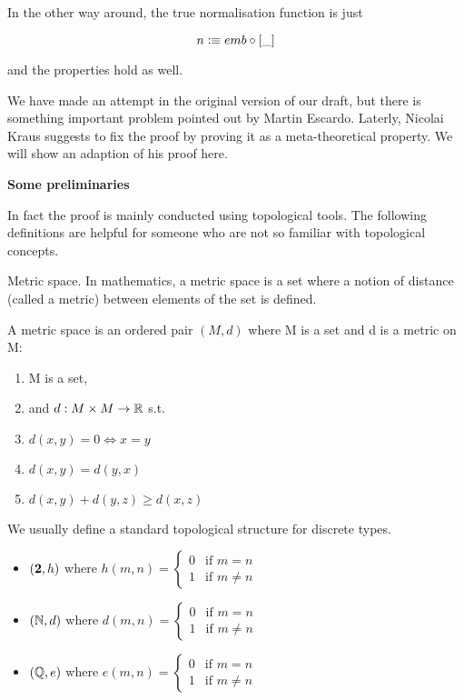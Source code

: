 In the other way around, the true normalisation function is just

\begin{equation*}
n \vcentcolon\equiv emb \circ [\_]
\end{equation*}

and the properties hold as well.


We have made an attempt in the original version of our \cite{aan}
draft, but there is something important problem pointed out by Martin Escardo. Laterly, Nicolai
Kraus suggests to fix the proof by proving it as a meta-theoretical
property. We will show an adaption of his proof here.

\textbf{Some preliminaries}

In fact the proof is mainly conducted using topological tools. The
following definitions are helpful for someone who are not so familiar
with topological concepts.


\begin{definition}
Metric space. In mathematics, a metric space is a set where a notion
of distance (called a metric) between elements of the set is defined.

A metric space is an ordered pair $(M , d)$ where M is a set and d is a metric on M:
\begin{enumerate}
\item M is a set,
\item and $d : M \times M \rightarrow \mathbb{R}$ s.t.
\item $d (x , y) = 0 \iff x = y$
\item $d(x,y)=d(y,x)$
\item $d(x,y)+d(y,z) \ge d(x,z)$ 
\end{enumerate}
\end{definition}

We usually define a standard topological structure for discrete types.

\begin{itemize}

\item $(\mathbf{2} , h)$ where 
$h(m,n) =
\left\{
	\begin{array}{ll}
		0  & \mbox{if } m = n \\
		1 & \mbox{if } m \neq n
	\end{array}
\right.
$

\item $(\mathbb{N} , d)$ where 
$d(m,n) =
\left\{
	\begin{array}{ll}
		0  & \mbox{if } m = n \\
		1 & \mbox{if } m \neq n
	\end{array}
\right.
$

\item $(\mathbb{Q} , e)$ where 
$e(m,n) =
\left\{
	\begin{array}{ll}
		0  & \mbox{if } m = n \\
		1 & \mbox{if } m \neq n
	\end{array}
\right.
$

\end{itemize}

